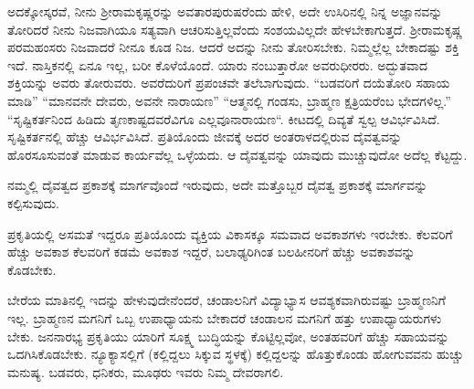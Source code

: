 ಅದಕ್ಕೋಸ್ಕರವೆ, ನೀನು ಶ‍್ರೀರಾಮಕೃಷ್ಣರನ್ನು ಅವತಾರಪುರುಷರೆಂದು ಹೇಳಿ, ಅದೇ ಉಸಿರಿನಲ್ಲಿ ನಿನ್ನ ಅಜ್ಞಾನವನ್ನು ತೋರಿದರೆ ನೀನು ನಿಜವಾಗಿಯೂ ಸತ್ಯವಾಗಿ ಆಚರಿಸುತ್ತಿಲ್ಲವೆಂದು ಸಂಶಯವಿಲ್ಲದೇ ಹೇಳಬೇಕಾಗುತ್ತದೆ. ಶ‍್ರೀರಾಮಕೃಷ್ಣ ಪರಮಹಂಸರು ನಿಜವಾದರೆ ನೀನೂ ಕೂಡ ನಿಜ. ಆದರೆ ಅದನ್ನು ನೀನು ತೋರಿಸಬೇಕು. ನಿಮ್ಮಲ್ಲೆಲ್ಲ ಬೇಕಾದಷ್ಟು ಶಕ್ತಿ ಇದೆ. ನಾಸ್ತಿಕನಲ್ಲಿ ಏನೂ ಇಲ್ಲ, ಬರೀ ಕೊಳೆಯೊಂದೆ. ಯಾರು ನಂಬುತ್ತಾರೋ ಅವರುಧೀರರು. ಅದ್ಭುತವಾದ ಶಕ್ತಿಯನ್ನು ಅವರು ತೋರುವರು. ಅವರೆದುರಿಗೆ ಪ್ರಪಂಚವೇ ತಲೆಬಾಗುವುದು. “ಬಡವರಿಗೆ ದಯೆತೋರಿ ಸಹಾಯ ಮಾಡಿ” “ಮಾನವನೇ ದೇವರು, ಅವನೇ ನಾರಾಯಣ” “ಆತ್ಮನಲ್ಲಿ ಗಂಡಸು, ಬ್ರಾಹ್ಮಣ ಕ್ಷತ್ರಿಯರೆಂಬ ಭೇದಗಳಿಲ್ಲ.” “ಸೃಷ್ಟಿಕರ್ತನಿಂದ ಹಿಡಿದು ತೃಣಕಾಷ್ಟದವರೆವಿಗೂ ಎಲ್ಲವೂ\break ನಾರಾಯಣ“. ಕೀಟದಲ್ಲಿ ದಿವ್ಯತೆ ಸ್ವಲ್ಪ ಆವಿರ್ಭವಿಸಿದೆ. ಸೃಷ್ಟಿಕರ್ತನಲ್ಲಿ ಹೆಚ್ಚು ಆವಿರ್ಭವಿಸಿದೆ. ಪ್ರತಿಯೊಂದು ಜೀವಕ್ಕೆ ಅದರ ಅಂತರಾಳದಲ್ಲಿರುವ ದೈವತ್ವವನ್ನು ಹೊರಸೂಸುವಂತೆ ಮಾಡುವ ಕಾರ್ಯವೆಲ್ಲ ಒಳ್ಳೆಯದು. ಆ ದೈವತ್ವವನ್ನು ಯಾವುದು ಮುಚ್ಚುವುದೋ ಅದೆಲ್ಲ ಕೆಟ್ಟದ್ದು.

ನಮ್ಮಲ್ಲಿ ದೈವತ್ವದ ಪ್ರಕಾಶಕ್ಕೆ ಮಾರ್ಗವೊಂದೆ ಇರುವುದು, ಅದೇ ಮತ್ತೊಬ್ಬರ ದೈವತ್ವ ಪ್ರಕಾಶಕ್ಕೆ ಮಾರ್ಗವನ್ನು ಕಲ್ಪಿಸುವುದು.

ಪ್ರಕೃತಿಯಲ್ಲಿ ಅಸಮತೆ ಇದ್ದರೂ ಪ್ರತಿಯೊಂದು ವ್ಯಕ್ತಿಯ ವಿಕಾಸಕ್ಕೂ ಸಮವಾದ ಅವಕಾಶಗಳು ಇರಬೇಕು. ಕೆಲವರಿಗೆ ಹೆಚ್ಚು ಅವಕಾಶ ಕೆಲವರಿಗೆ ಕಡಮೆ ಅವಕಾಶ ಇದ್ದರೆ, ಬಲಾಢ್ಯರಿಗಿಂತ ಬಲಹೀನರಿಗೆ ಹೆಚ್ಚು ಅವಕಾಶವನ್ನು ಕೊಡಬೇಕು.

ಬೇರೆಯ ಮಾತಿನಲ್ಲಿ ಇದನ್ನು ಹೇಳುವುದೇನೆಂದರೆ, ಚಂಡಾಲನಿಗೆ ವಿದ್ಯಾಭ್ಯಾಸ ಆವಶ್ಯಕವಾಗಿರುವಷ್ಟು ಬ್ರಾಹ್ಮಣನಿಗೆ ಇಲ್ಲ. ಬ್ರಾಹ್ಮಣನ ಮಗನಿಗೆ ಒಬ್ಬ ಉಪಾಧ್ಯಾಯನು ಬೇಕಾದರೆ ಚಂಡಾಲನ ಮಗನಿಗೆ ಹತ್ತು ಉಪಾಧ್ಯಾಯರುಗಳು ಬೇಕು. ಜನನಾರಭ್ಯ ಪ್ರಕೃತಿಯು ಯಾರಿಗೆ ಸೂಕ್ಷ್ಮ ಬುದ್ಧಿಯನ್ನು ಕೊಟ್ಟಿಲ್ಲವೋ, ಅಂತಹವರಿಗೆ ಹೆಚ್ಚು ಸಹಾಯವನ್ನು ಒದಗಿಸಿಕೊಡಬೇಕು. ನ್ಯೂಕ್ಯಾಸಲ್ಲಿಗೆ (ಕಲ್ಲಿದ್ದಲು ಸಿಕ್ಕುವ ಸ್ಥಳಕ್ಕೆ) ಕಲ್ಲಿದ್ದಲನ್ನು ಹೊತ್ತುಕೊಂಡು ಹೋಗುವವನು ಹುಚ್ಚು ಮನುಷ್ಯ. ಬಡವರು, ಧನಿಕರು, ಮೂಢರು ಇವರು ನಿಮ್ಮ ದೇವರಾಗಲಿ.
\newpage

